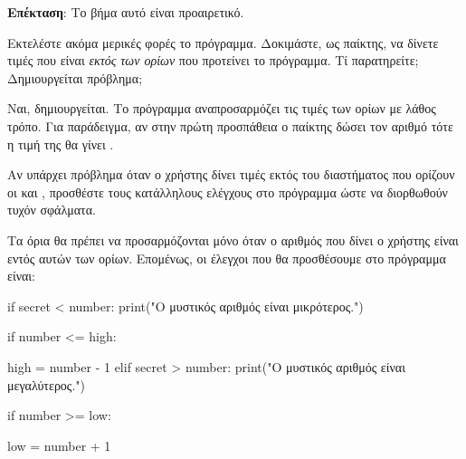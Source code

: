 \documentclass[a4paper,11pt,oneside]{book}
\begin{document}
\clearpage
\begin{step}
\begin{note}
\textbf{Επέκταση}: Το βήμα αυτό είναι προαιρετικό. 
\end{note}

Εκτελέστε ακόμα μερικές φορές το πρόγραμμα. Δοκιμάστε, ως παίκτης, να δίνετε τιμές που είναι \emph{εκτός των ορίων} που προτείνει το πρόγραμμα. Τί παρατηρείτε; Δημιουργείται πρόβλημα;

\begin{answer}
	Ναι, δημιουργείται. Το πρόγραμμα αναπροσαρμόζει τις τιμές των ορίων με λάθος τρόπο. Για παράδειγμα, αν στην πρώτη προσπάθεια ο παίκτης δώσει τον αριθμό  τότε η τιμή της  θα γίνει .
\end{answer}

Αν υπάρχει πρόβλημα όταν ο χρήστης δίνει τιμές εκτός του διαστήματος που ορίζουν οι  και , προσθέστε τους κατάλληλους ελέγχους στο πρόγραμμα ώστε να διορθωθούν τυχόν σφάλματα.

\begin{answer}
Τα όρια θα πρέπει να προσαρμόζονται μόνο όταν ο αριθμός  που δίνει ο χρήστης είναι εντός αυτών των ορίων. Επομένως, οι έλεγχοι που θα προσθέσουμε στο πρόγραμμα είναι:
	
\begin{pyplain}	
if secret < number:
    print("Ο μυστικός αριθμός είναι μικρότερος.")	   
\end{pyplain}
\begin{pynew}
    if number <= high:
\end{pynew}
\begin{pyplain}
        high = number - 1    
elif secret > number:
    print("Ο μυστικός αριθμός είναι μεγαλύτερος.") 	    
\end{pyplain}
\begin{pynew}
    if number >= low:
\end{pynew}
\begin{pyplain}
        low = number + 1
\end{pyplain}
\end{answer}
\end{step}
\end{document}
